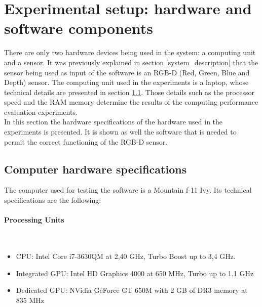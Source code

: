 \section{Experimental setup: hardware and software components}
There are only two hardware devices being used in the system: a computing unit and a sensor. 
It was previously explained in section \ref{system_description} that the sensor being used as input of the software is an RGB-D (Red, Green, Blue and Depth) sensor. 
The computing unit used in the experiments is a laptop, whose technical details are presented in section \ref{computer}. 
Those details such as the processor speed and the RAM memory determine the results of the computing performance evaluation experiments. 
\\

In this section the hardware specifications of the hardware used in the experiments is presented. 
It is shown as well the software that is needed to permit the correct functioning of the RGB-D sensor.



\subsection{Computer hardware specifications}
\label{computer}
	The computer used for testing the software is a Mountain f-11 Ivy. %
	Its technical specifications are the following: 




	\paragraph{Processing Units} \mbox{}\\
		\begin{itemize}
			\item{CPU: Intel Core i7-3630QM at 2,40 GHz, Turbo Boost up to 3,4 GHz.}
			\item{Integrated GPU:  Intel HD Graphics 4000 at 650 MHz,  Turbo up to 1.1 GHz }
			\item{Dedicated GPU: NVidia GeForce GT 650M with 2 GB of DR3 memory at 835 MHz }
		\end{itemize}

